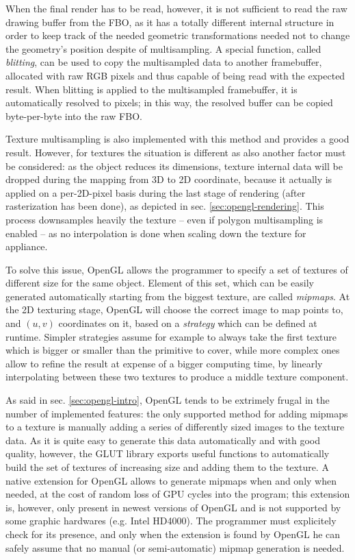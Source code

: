 When the final render has to be read, however, it is not sufficient to read the
raw drawing buffer from the FBO, as it has a totally different internal
structure in order to keep track of the needed geometric transformations needed
not to change the geometry's position despite of multisampling. A special
function, called \emph{blitting}, can be used to copy the multisampled data to
another framebuffer, allocated with raw RGB pixels and thus capable of being
read with the expected result. When blitting is applied to the multisampled
framebuffer, it is automatically resolved to pixels; in this way, the resolved
buffer can be copied byte-per-byte into the raw FBO.

Texture multisampling is also implemented with this method and provides a good
result. However, for textures the situation is different as also another factor
must be considered: as the object reduces
its dimensions, texture internal data will be dropped during the mapping from 3D
to 2D coordinate, because it actually is applied on a per-2D-pixel basis during the
last stage of rendering (after rasterization has been done), as depicted in sec.
\ref{sec:opengl-rendering}. This process downsamples heavily the texture -- even if
polygon multisampling is enabled -- as no interpolation is done when scaling
down the texture for appliance.

To solve this issue, OpenGL allows the programmer to specify a set of textures
of different size for the same object. Element of this set, which can be easily
generated automatically starting from the biggest texture, are called
\emph{mipmaps}. At the 2D texturing stage, OpenGL will choose the correct image
to map points to, and $(u,v)$ coordinates on it, based on a \emph{strategy}
which can be defined at runtime. Simpler strategies assume for example to always
take the first texture which is bigger or smaller than the primitive to cover,
while more complex ones allow to refine the result at expense of a bigger
computing time, by linearly interpolating between these two textures to produce
a middle texture component.

As said in sec. \ref{sec:opengl-intro}, OpenGL tends to be extrimely frugal in the
number of implemented features: the only supported method for adding mipmaps to
a texture is manually adding a series of differently sized images to the texture
data. As it is quite easy to generate this data automatically and with good
quality, however, the GLUT library exports useful functions to automatically
build the set of textures of increasing size and adding them to the texture.
A native extension for OpenGL allows to generate mipmaps when and only when
needed, at the cost of random loss of GPU cycles into the program; this extension is,
however, only present in newest versions of OpenGL and is not supported by some
graphic hardwares (e.g. Intel HD4000). The programmer must explicitely check for
its presence, and only when the extension is found by OpenGL he can safely
assume that no manual (or semi-automatic) mipmap generation is needed.

